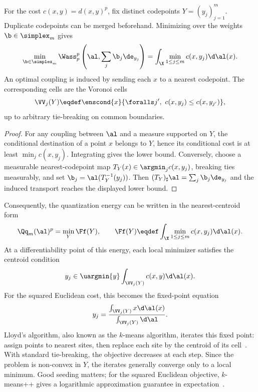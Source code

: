 \begin{prop}\label{prop-free-masses-voronoi}
	For the cost $c(x,y)=d(x,y)^p$, fix distinct codepoints $Y=(y_j)_{j=1}^m$. Duplicate codepoints can be merged beforehand. Minimizing over the weights $\b\in\simplex_m$ gives
	\[
		\min_{\b\in\simplex_m}
		\Wass_p^p\left(\al,\sum_j \b_j\de_{y_j}\right)
		=
		\int_\X \min_{1\leq j\leq m} c(x,y_j)\d\al(x).
	\]
	An optimal coupling is induced by sending each $x$ to a nearest codepoint. The corresponding cells are the Voronoi cells
	\[
		\VV_j(Y)
		\eqdef
		\enscond{x}{\foralls j',\ c(x,y_j)\leq c(x,y_{j'})},
	\]
	up to arbitrary tie-breaking on common boundaries.
\end{prop}
\begin{proof}
	For any coupling between $\al$ and a measure supported on $Y$, the conditional destination of a point $x$ belongs to $Y$, hence its conditional cost is at least $\min_j c(x,y_j)$. Integrating gives the lower bound. Conversely, choose a measurable nearest-codepoint map $T_Y(x)\in\argmin_j c(x,y_j)$, breaking ties measurably, and set $\b_j=\al(T_Y^{-1}(y_j))$. Then $(T_Y)_\sharp\al=\sum_j \b_j\de_{y_j}$ and the induced transport reaches the displayed lower bound.
\end{proof}

Consequently, the quantization energy can be written in the nearest-centroid form
\[
	\Qq_m(\al)^p
	=
	\min_Y \Ff(Y),
	\qquad
	\Ff(Y)
	\eqdef
	\int_\X \min_{1\leq j\leq m} c(x,y_j)\d\al(x).
\]
At a differentiability point of this energy, each local minimizer satisfies the centroid condition
\[
	y_j
	\in
	\uargmin{y}
	\int_{\VV_j(Y)} c(x,y)\d\al(x).
\]
For the squared Euclidean cost, this becomes the fixed-point equation
\[
	y_j
	=
	\frac{\int_{\VV_j(Y)} x\d\al(x)}
	{\int_{\VV_j(Y)} \d\al}.
\]
Lloyd's algorithm, also known as the $k$-means algorithm, iterates this fixed point: assign points to nearest sites, then replace each site by the centroid of its cell~\cite{Lloyd82}. With standard tie-breaking, the objective decreases at each step. Since the problem is non-convex in $Y$, the iterates generally converge only to a local minimum. Good seeding matters; for the squared Euclidean objective, $k$-means++ gives a logarithmic approximation guarantee in expectation~\cite{ArthurVassilvitskii2007}.

